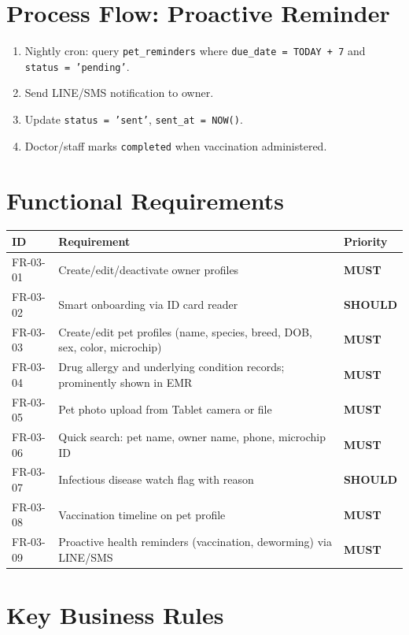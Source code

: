 \documentclass[12pt,a4paper]{report}
\newcommand{\must}{\colorbox{red!15}{\color{errorred}\textbf{\small MUST}}}
\newcommand{\should}{\colorbox{orange!15}{\color{warnorange}\textbf{\small SHOULD}}}
\begin{document}
\section{Process Flow: Proactive Reminder}

\begin{enumerate}
  \item Nightly cron: query \texttt{pet\_reminders} where \texttt{due\_date = TODAY + 7} and \texttt{status = 'pending'}.
  \item Send LINE/SMS notification to owner.
  \item Update \texttt{status = 'sent'}, \texttt{sent\_at = NOW()}.
  \item Doctor/staff marks \texttt{completed} when vaccination administered.
\end{enumerate}

\section{Functional Requirements}

\begin{longtable}{L{2.5cm} L{9cm} C{2cm}}
\toprule
\textbf{ID} & \textbf{Requirement} & \textbf{Priority} \\\midrule\endhead\bottomrule\endfoot
FR-03-01 & Create/edit/deactivate owner profiles & \must \\
FR-03-02 & Smart onboarding via ID card reader & \should \\
FR-03-03 & Create/edit pet profiles (name, species, breed, DOB, sex, color, microchip) & \must \\
FR-03-04 & Drug allergy and underlying condition records; prominently shown in EMR & \must \\
FR-03-05 & Pet photo upload from Tablet camera or file & \must \\
FR-03-06 & Quick search: pet name, owner name, phone, microchip ID & \must \\
FR-03-07 & Infectious disease watch flag with reason & \should \\
FR-03-08 & Vaccination timeline on pet profile & \must \\
FR-03-09 & Proactive health reminders (vaccination, deworming) via LINE/SMS & \must \\
\end{longtable}

\section{Key Business Rules}
\end{document}
